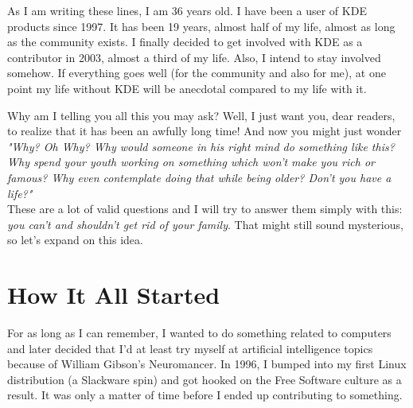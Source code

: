 

As I am writing these lines, I am 36 years old. I have been a user of KDE
products since 1997. It has been 19 years, almost half of my life, almost
as long as the community exists. I finally decided to get involved with KDE
as a contributor in 2003, almost a third of my life. Also, I intend to stay
involved somehow. If everything goes well (for the community and also for me),
at one point my life without KDE will be anecdotal compared to my life with
it.

Why am I telling you all this you may ask? Well, I just want you, dear readers,
to realize that it has been an awfully long time! And now you might just wonder
\emph{"Why? Oh Why? Why would someone in his right mind do something like this?
Why spend your youth working on something which won't make you rich or famous?
Why even contemplate doing that while being older? Don't you have a life?"} \\

These are a lot of valid questions and I will try to answer them simply with this:
\emph{you can't and shouldn't get rid of your family}. That might still sound
mysterious, so let's expand on this idea.

\section*{How It All Started}
For as long as I can remember, I wanted to do something related to computers and
later decided that I'd at least try myself at artificial intelligence topics because of William Gibson's
Neuromancer. In 1996, I bumped into my first Linux distribution (a Slackware
spin) and got hooked on the Free Software culture as a result. It was only a
matter of time before I ended up contributing to something. \\

